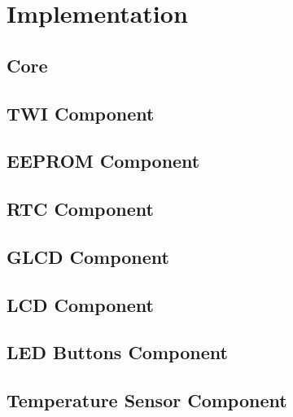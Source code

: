 
\chapter{Implementation} \label{chapter:implementation}

\section{Core}

\section{TWI Component}

\section{EEPROM Component}

\cite{microchip01}

\section{RTC Component}

\cite{maxim01}

\section{GLCD Component}

\cite{winstar01, samsung01, neotec01}

\section{LCD Component}

\cite{hitachi01, samsung02, winstar02}

\section{LED Buttons Component}

\section{Temperature Sensor Component}

\cite{maxim02}

